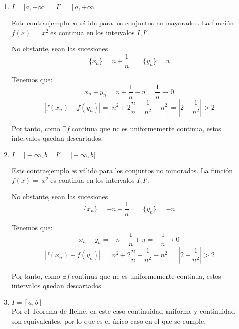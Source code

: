 \begin{ejercicio}
\begin{enumerate}
        \item $I=[a,+\infty[ \quad I'=]a, +\infty[$

        Este contraejemplo es válido para los conjuntos no mayorados. La función $f(x)=~x^2$ es continua en los intervalos $I,I'$.
        
        No obstante, sean las sucesiones
        \begin{equation*}
            \{x_n\} = n+\frac{1}{n}
            \qquad
            \{y_n\} = n
        \end{equation*}

        Tenemos que:
        \begin{equation*}
            x_n-y_n = n+\frac{1}{n} -n = \frac{1}{n}  \to 0
        \end{equation*}
        \begin{equation*}
            |f(x_n)-f(y_n)| = \left| n^2 +2\frac{n}{n} + \frac{1}{n^2} -n^2 \right| = \left| 2+\frac{1}{n^2}\right| > 2
        \end{equation*}

        Por tanto, como $\exists f$ continua que no es uniformemente continua, estos intervalos quedan descartados.

        \item $I=]-\infty,b] \quad I'=]-\infty,b[$

        Este contraejemplo es válido para los conjuntos no minorados. La función $f(x)=~x^2$ es continua en los intervalos $I,I'$.
        
        No obstante, sean las sucesiones
        \begin{equation*}
            \{x_n\} = -n-\frac{1}{n}
            \qquad
            \{y_n\} = -n
        \end{equation*}

        Tenemos que:
        \begin{equation*}
            x_n-y_n = -n-\frac{1}{n} +n = -\frac{1}{n}  \to 0
        \end{equation*}
        \begin{equation*}
            |f(x_n)-f(y_n)| = \left| n^2 +2\frac{n}{n} + \frac{1}{n^2} -n^2 \right| = \left| 2+\frac{1}{n^2}\right| > 2
        \end{equation*}

        Por tanto, como $\exists f$ continua que no es uniformemente continua, estos intervalos quedan descartados.        

        \item $I=[a,b]$\\
        Por el Teorema de Heine, en este caso continuidad uniforme y continuidad son equivalentes, por lo que es el único caso en el que se cumple.
    \end{enumerate}
\end{ejercicio}

